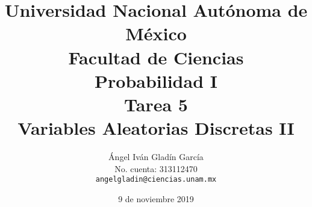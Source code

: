 \documentclass[11pt,letterpaper]{report}
\begin{document}
\title{
        Universidad Nacional Autónoma de México\\
        Facultad de Ciencias\\
        Probabilidad I\\
    \vspace{1cm}
    \large
        \textbf{Tarea 5}\\
        \textbf{Variables Aleatorias Discretas II}
}
\author{
    Ángel Iván Gladín García\\
    No. cuenta: 313112470\\
    \texttt{angelgladin@ciencias.unam.mx}
}
\date{9 de noviembre 2019}
\maketitle

\newtheorem{theorem}{Teorema}
\newtheorem{example}{Ejemplo}
\newtheorem{corollary}{Corolario}
\newtheorem{lemma}{Lemma}
\newtheorem{definition}{Definicion}
\newtheorem{prop}{Proposicion}
\end{document}
